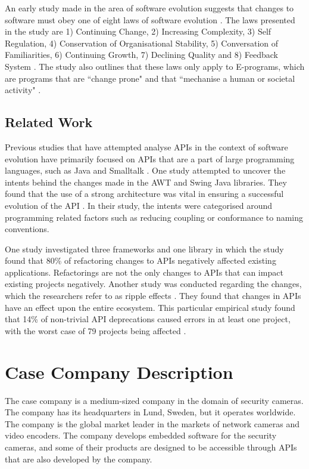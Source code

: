 \documentclass{sig-alternate}
\begin{document}
An early study made in the area of software evolution suggests that changes to software must obey one of eight laws of software evolution \cite{lehman1980programs}. The laws presented in the study are 1) Continuing Change, 2) Increasing Complexity, 3) Self Regulation, 4) Conservation of Organisational Stability, 5) Conversation of Familiarities, 6) Continuing Growth, 7) Declining Quality and 8) Feedback System \cite{lehman1980programs}. The study also outlines that these laws only apply to E-programs, which are programs that are ``change prone" and that ``mechanise a human or societal activity" \cite{lehman1980programs}.

\subsection{Related Work} \label{related_work}
Previous studies that have attempted analyse APIs in the context of software evolution have primarily focused on APIs that are a part of large programming languages, such as Java \cite{hou2011exploring} \cite{shi2011empirical} and Smalltalk \cite{robbes2012developers}. One study \cite{hou2011exploring} attempted to uncover the intents behind the changes made in the AWT and Swing Java libraries. They found that the use of a strong architecture was vital in ensuring a successful evolution of the API \cite{hou2011exploring}. In their study, the intents were categorised around programming related factors such as reducing coupling or conformance to naming conventions.

One study \cite{dig2005role} investigated three frameworks and one library in which the study found that 80\% of refactoring changes to APIs negatively affected existing applications. Refactorings are not the only changes to APIs that can impact existing projects negatively. Another study was conducted regarding the changes, which the researchers refer to as ripple effects \cite{robbes2012developers}. They found that changes in APIs have an effect upon the entire ecosystem. This particular empirical study found that 14\% of non-trivial API deprecations caused errors in at least one project, with the worst case of 79 projects being affected \cite{robbes2012developers}.


\section{Case Company Description} \label{case_company_description}
The case company is a medium-sized company in the domain of security cameras. The company has its headquarters in Lund, Sweden, but it operates worldwide. The company is the global market leader in the markets of network cameras and video encoders. The company develops embedded software for the security cameras, and some of their products are designed to be accessible through APIs that are also developed by the company. 
\end{document}
